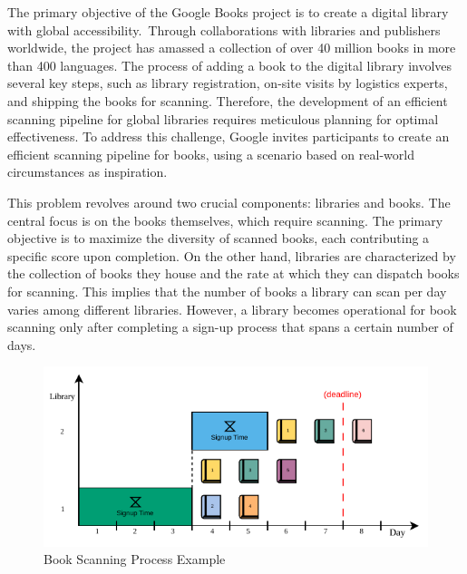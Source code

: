 The primary objective of the Google Books project is to create a digital library
with global accessibility.~Through collaborations with libraries and publishers
worldwide, the project has amassed a collection of over 40 million books in more
than 400 languages. The process of adding a book to the digital library involves
several key steps, such as library registration, on-site visits by logistics
experts, and shipping the books for scanning. Therefore, the development of an
efficient scanning pipeline for global libraries requires meticulous planning
for optimal effectiveness. To address this challenge, Google invites
participants to create an efficient scanning pipeline for books, using a
scenario based on real-world circumstances as inspiration.

This problem revolves around two crucial components: libraries and books. The
central focus is on the books themselves, which require scanning. The primary
objective is to maximize the diversity of scanned books, each contributing a
specific score upon completion. On the other hand, libraries are characterized
by the collection of books they house and the rate at which they can dispatch
books for scanning. This implies that the number of books a library can scan per
day varies among different libraries. However, a library becomes operational for
book scanning only after completing a sign-up process that spans a certain
number of days.

\begin{figure}[h]
  \centering
  \includegraphics[width=\textwidth,keepaspectratio]{../assets/bs/bs-example.pdf}
  \caption{Book Scanning Process Example}
  \label{fig:bs-example}
\end{figure}